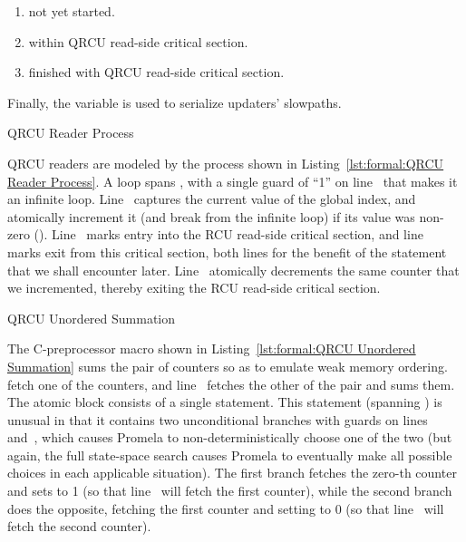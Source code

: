 \begin{enumerate}[label={\arabic*}:,start=0,itemsep=0pt]
\item	not yet started.
\item	within QRCU read-side critical section.
\item	finished with QRCU read-side critical section.
\end{enumerate}

Finally, the  variable is used to serialize updaters' slowpaths.

\begin{listing}

\caption{QRCU Reader Process}
\label{lst:formal:QRCU Reader Process}
\end{listing}

\begin{fcvref}
QRCU readers are modeled by the  process shown in
Listing~\ref{lst:formal:QRCU Reader Process}.
A  loop spans ,
with a single guard of ``1''
on line~ that makes it an infinite loop.
Line~ captures the current value of the global index,
and 
atomically increment it (and break from the infinite loop)
if its value was non-zero ().
Line~ marks entry into the RCU read-side critical section, and
line~ marks exit from this critical section,
both lines for the benefit of
the  statement that we shall encounter later.
Line~ atomically decrements the same counter that we incremented,
thereby exiting the RCU read-side critical section.
\end{fcvref}

\begin{listing}

\caption{QRCU Unordered Summation}
\label{lst:formal:QRCU Unordered Summation}
\end{listing}

\begin{fcvref}
The C-preprocessor macro shown in
Listing~\ref{lst:formal:QRCU Unordered Summation}
sums the pair of counters so as to emulate weak memory ordering.
 fetch one of the counters,
and line~ fetches the other
of the pair and sums them.
The atomic block consists of a single  statement.
This  statement (spanning ) is unusual in that
it contains two unconditional
branches with guards on lines~ and~, which causes Promela to
non-deterministically choose one of the two (but again, the full
state-space search causes Promela to eventually make all possible
choices in each applicable situation).
The first branch fetches the zero-th counter and sets  to 1 (so
that line~ will fetch the first counter), while the second
branch does the opposite, fetching the first counter and setting 
to 0 (so that line~ will fetch the second counter).
\end{fcvref}

